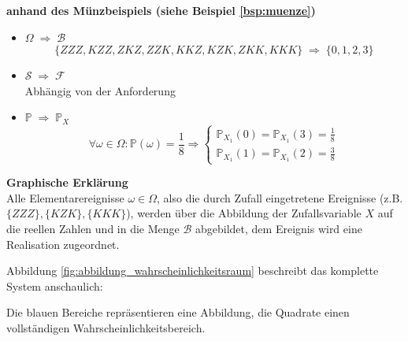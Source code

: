 {    \begin{bsp}\label{bsp:abbildung_wahrscheinlichkeitsraum} \textbf{anhand des Münzbeispiels (siehe Beispiel \ref{bsp:muenze})}\\
        \begin{itemize}
            \item $\Omega\;\Rightarrow\;\mathcal B$
                \[\{ZZZ,KZZ,ZKZ,ZZK,KKZ,KZK,ZKK,KKK\}\;\Rightarrow\;\{0,1,2,3\}\]
            \item $\mathcal S\;\Rightarrow\;\mathcal F$\\
                Abhängig von der Anforderung
            \item $\mathbb P\;\Rightarrow\;\mathbb P_X$
                \[\forall \omega \in \Omega :\mathbb P\left(\omega \right)=\frac{1}{8}\Rightarrow
                    \begin{cases}\mathbb P_{X_1}\left(0\right)=\mathbb P_{X_1}\left(3\right)=\frac{1}{8}\\
                    \mathbb P_{X_1}\left(1\right)=\mathbb P_{X_1}\left(2\right)=\frac{3}{8}
                    \end{cases}\]
        \end{itemize}

        \textbf{Graphische Erklärung}\\
        Alle Elementarereignisse  $\omega \in \Omega$, also
        die durch Zufall eingetretene Ereignisse (z.B. $\{ZZZ\},\{KZK\},\{KKK\}$),
        werden über die Abbildung der Zufallsvariable $X$ auf die reellen Zahlen
        und in die Menge $\mathcal B$
        abgebildet, dem Ereignis wird eine Realisation zugeordnet. 

        Abbildung \ref{fig:abbildung_wahrscheinlichkeitsraum} beschreibt das komplette System anschaulich: 
        
        Die blauen Bereiche repräsentieren eine Abbildung, die Quadrate einen
        vollständigen Wahrscheinlichkeitsbereich.

    \end{bsp}

}
